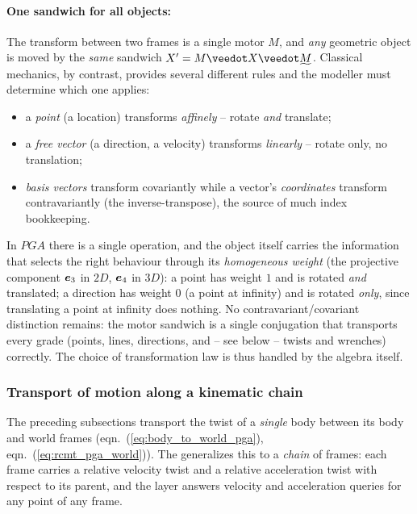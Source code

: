 \paragraph{One sandwich for all objects:} The transform between two frames is a single
motor $M$, and \emph{any} geometric object is
moved by the \emph{same} sandwich $X' = M \veedot X \veedot \rrev{M}$. Classical
mechanics, by contrast, provides several different rules and the modeller must determine
which one applies:
\begin{itemize}
    \item a \emph{point} (a location) transforms \emph{affinely} -- rotate \emph{and}
          translate;
    \item a \emph{free vector} (a direction, a velocity) transforms \emph{linearly} --
          rotate only, no translation;
    \item \emph{basis vectors} transform covariantly while a vector's \emph{coordinates}
          transform contravariantly (the inverse-transpose), the source of much index
          bookkeeping.
\end{itemize}
In $PGA$ there is a single operation, and the object itself carries the information that
selects the right behaviour through its \emph{homogeneous weight} (the projective
component $\bm{e}_{3}$ in $2D$, $\bm{e}_{4}$ in $3D$): a point has weight $1$ and is rotated
\emph{and} translated; a direction has weight $0$ (a point at infinity) and is rotated
\emph{only}, since translating a point at infinity does nothing. No
contravariant/covariant distinction remains: the motor sandwich is a single
conjugation that transports every grade (points, lines, directions, and --
see below -- twists and wrenches) correctly. The choice of transformation law is thus
handled by the algebra itself.


\subsubsection{Transport of motion along a kinematic chain}
\label{subsubsection:transport_along_chain}

The preceding subsections transport the twist of a \emph{single} body between its body and
world frames (eqn.~(\ref{eq:body_to_world_pga}), eqn.~(\ref{eq:rcmt_pga_world})). The
 generalizes this to a \emph{chain} of frames: each frame
carries a relative velocity twist and a relative acceleration twist with respect to its
parent, and the layer answers velocity and acceleration queries for any point of any
frame.

